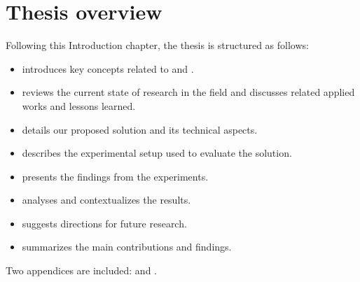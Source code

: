 \begin{quote}
    \begin{questions}
        \item \rqdecreasedriveability
        \label{rq:decrease-driveability}
        \item \rqnohuman
        \label{rq:no-human}
    \end{questions}
\end{quote}

\newpage %

\section{Thesis overview}

Following this Introduction chapter, the thesis is structured as follows:

\begin{itemize}
    \item {} introduces key concepts related to  and .
    \item {} reviews the current state of research in the field and discusses related applied works and lessons learned.
    \item {} details our proposed solution and its technical aspects.
    \item {} describes the experimental setup used to evaluate the solution.
    \item {} presents the findings from the experiments.
    \item {} analyses and contextualizes the results.
    \item {} suggests directions for future research.
    \item {} summarizes the main contributions and findings.
\end{itemize}

Two appendices are included:  and .

